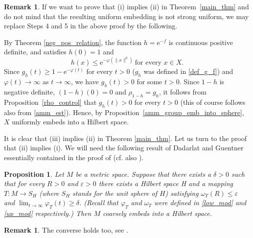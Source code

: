 \documentclass[a4paper,oneside]{amsart}
\newtheorem{pro}[thm]{Proposition}
\theoremstyle{definition}
\newtheorem{rem}[thm]{Remark}
\begin{document}
\begin{rem}
If we want to prove that (i) implies (ii) in Theorem~\ref{main_thm} and do not mind that the resulting uniform embedding is not strong uniform, we may replace Steps 4 and 5 in the above proof by the following.

By Theorem \ref{neg_pos_relation}, the function $h={\mathrm{e}}^{-f}$ is continuous positive definite, and satisfies $h(0)=1$ and 
$$h(x)\leq{\mathrm{e}}^{-\varphi(\|x\|^p)}\ \text{for every }x\in X.$$
Since $g_h(t)\geq1-{\mathrm{e}}^{-\varphi(t)}$ for every $t>0$ ($g_h$ was defined in \eqref{def_g_f}) and $\varphi(t)\to\infty$ as $t\to\infty$, we have $g_h(t)>0$ for some $t>0$. Since $1-h$ is negative definite, $(1-h)(0)=0$ and $\rho_{1-h}=g_h$, it follows from Proposition~\ref{rho_control} that $g_h(t)>0$ for every $t>0$ (this of course follows also from \eqref{amm_est}). Hence, by Proposition~\ref{amm_group_emb_into_sphere}, $X$ uniformly embeds into a Hilbert space.
\end{rem}

It is clear that (iii) implies (ii) in Theorem \ref{main_thm}. Let us turn to the proof that (ii) implies (i). We will need the following result of Dadarlat and Guentner essentially contained in the proof of \cite[Proposition~2.1]{dg} (cf. also \cite[Theorem 3]{no}).

\begin{pro}\label{dg_prop_2.1}
Let $M$ be a metric space. Suppose that there exists a $\delta>0$ such that for every $R>0$ and $\varepsilon>0$ there exists a Hilbert space H and a mapping $T:M\to S_H$ (where $S_H$ stands for the unit sphere of $H$) satisfying $\omega_T(R)\leq\varepsilon$ and $\lim_{t\to\infty}\varphi_T(t)\geq\delta$. (Recall that $\varphi_T$ and $\omega_T$ were defined in \eqref{low_mod} and \eqref{up_mod} respectively.) Then $M$ coarsely embeds into a Hilbert space.
\end{pro}

\begin{rem}
The converse holds too, see \cite[Proposition~2.1]{dg}.
\end{rem}
\end{document}
